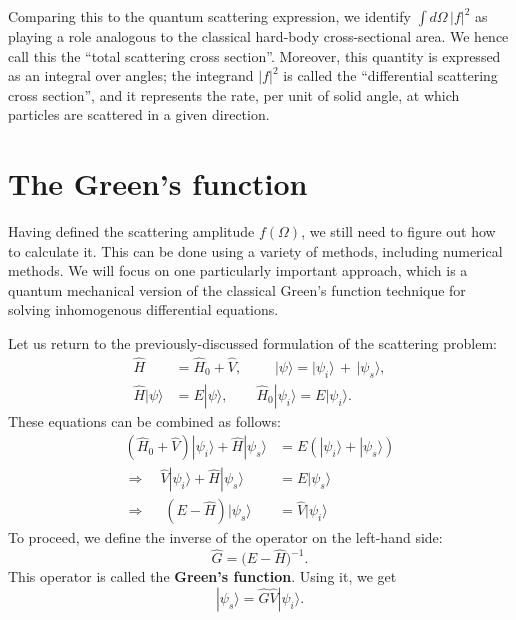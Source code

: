 \documentclass[pra,12pt]{revtex4}
\begin{document}
Comparing this to the quantum scattering expression, we identify $\int
d\Omega\,|f|^2$ as playing a role analogous to the classical hard-body
cross-sectional area.  We hence call this the ``total scattering cross
section''.  Moreover, this quantity is expressed as an integral over
angles; the integrand $|f|^2$ is called the ``differential scattering
cross section'', and it represents the rate, per unit of solid angle,
at which particles are scattered in a given direction.

\section{The Green's function}

Having defined the scattering amplitude $f(\Omega)$, we still need to
figure out how to calculate it.  This can be done using a variety of
methods, including numerical methods.  We will focus on one
particularly important approach, which is a quantum mechanical version
of the classical Green's function technique for solving inhomogenous
differential equations.

Let us return to the previously-discussed formulation of the
scattering problem:
$$\begin{aligned} \hat{H} &= \hat{H}_0+\hat{V}, \,\,\quad\quad |\psi\rangle = |\psi_i\rangle \,+\, |\psi_s\rangle, \\ \hat{H} |\psi\rangle &= E |\psi\rangle, \quad\quad \hat{H}_0 |\psi_i\rangle = E |\psi_i\rangle.\end{aligned}$$
These equations can be combined as follows:
$$\begin{aligned} \left(\hat{H}_0 + \hat{V}\right) |\psi_i\rangle + \hat{H} |\psi_s\rangle &= E \left( |\psi_i\rangle + |\psi_s\rangle \right) \\ \Rightarrow \quad \hat{V} |\psi_i\rangle + \hat{H} |\psi_s\rangle &= E |\psi_s\rangle  \\ \Rightarrow \quad\; \left(E - \hat{H}\right) |\psi_s\rangle & = \hat{V} |\psi_i\rangle
\end{aligned}$$
To proceed, we define the inverse of the operator on the left-hand
side:
$$\hat{G} = \big(E-\hat{H}\big)^{-1}.$$
This operator is called the \textbf{Green's function}.  Using it, we
get
$$|\psi_s\rangle = \hat{G} \hat{V} |\psi_i\rangle.$$
\end{document}
